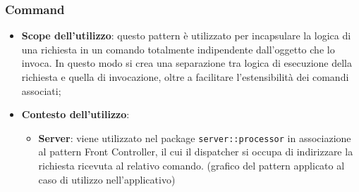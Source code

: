 	\subsubsection{Command} %
	\label{ssub:command}
		\begin{itemize}
			\item \textbf{Scope dell'utilizzo}: questo pattern è utilizzato per incapsulare la logica di una richiesta in un comando totalmente indipendente dall'oggetto che lo invoca. In questo modo si crea una separazione tra logica di esecuzione della richiesta e quella di invocazione, oltre a facilitare l'estensibilità dei comandi associati;
			\item \textbf{Contesto dell'utilizzo}:
				\begin{itemize}
					\item \textbf{Server}: viene utilizzato nel package \texttt{server::processor} in associazione al pattern Front Controller, il cui il dispatcher si occupa di indirizzare la richiesta ricevuta al relativo comando. \newline
					[TO DO] (grafico del pattern applicato al caso di utilizzo nell'applicativo)
				\end{itemize}
		\end{itemize}
